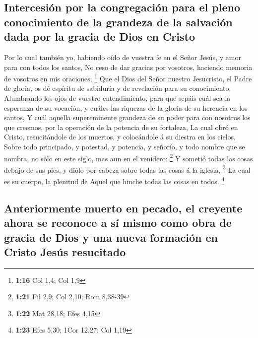 \hypertarget{intercesiuxf3n-por-la-congregaciuxf3n-para-el-pleno-conocimiento-de-la-grandeza-de-la-salvaciuxf3n-dada-por-la-gracia-de-dios-en-cristo}{%
\subsection{Intercesión por la congregación para el pleno conocimiento
de la grandeza de la salvación dada por la gracia de Dios en
Cristo}\label{intercesiuxf3n-por-la-congregaciuxf3n-para-el-pleno-conocimiento-de-la-grandeza-de-la-salvaciuxf3n-dada-por-la-gracia-de-dios-en-cristo}}

 Por lo cual también yo, habiendo oído de vuestra fe en
el Señor Jesús, y amor para con todos los santos,  No
ceso de dar gracias por vosotros, haciendo memoria de vosotros en mis
oraciones; \footnote{\textbf{1:16} Col 1,4; Col 1,9}  Que
el Dios del Señor nuestro Jesucristo, el Padre de gloria, os dé espíritu
de sabiduría y de revelación para su conocimiento; 
Alumbrando los ojos de vuestro entendimiento, para que sepáis cuál sea
la esperanza de su vocación, y cuáles las riquezas de la gloria de su
herencia en los santos,  Y cuál aquella supereminente
grandeza de su poder para con nosotros los que creemos, por la operación
de la potencia de su fortaleza,  La cual obró en Cristo,
resucitándole de los muertos, y colocándole á su diestra en los cielos,
 Sobre todo principado, y potestad, y potencia, y
señorío, y todo nombre que se nombra, no sólo en este siglo, mas aun en
el venidero: \footnote{\textbf{1:21} Fil 2,9; Col 2,10; Rom 8,38-39}
 Y sometió todas las cosas debajo de sus pies, y diólo
por cabeza sobre todas las cosas á la iglesia, \footnote{\textbf{1:22}
  Mat 28,18; Efes 4,15}  La cual es su cuerpo, la
plenitud de Aquel que hinche todas las cosas en todos. \footnote{\textbf{1:23}
  Efes 5,30; 1Cor 12,27; Col 1,19}

\hypertarget{anteriormente-muerto-en-pecado-el-creyente-ahora-se-reconoce-a-suxed-mismo-como-obra-de-gracia-de-dios-y-una-nueva-formaciuxf3n-en-cristo-jesuxfas-resucitado}{%
\subsection{Anteriormente muerto en pecado, el creyente ahora se
reconoce a sí mismo como obra de gracia de Dios y una nueva formación en
Cristo Jesús
resucitado}\label{anteriormente-muerto-en-pecado-el-creyente-ahora-se-reconoce-a-suxed-mismo-como-obra-de-gracia-de-dios-y-una-nueva-formaciuxf3n-en-cristo-jesuxfas-resucitado}}

